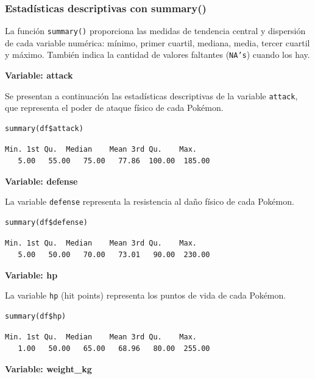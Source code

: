 \documentclass[11pt,a4paper]{article}
\begin{document}
\subsubsection{Estadísticas descriptivas con summary()}

La función \texttt{summary()} proporciona las medidas de tendencia central y dispersión de cada variable
numérica: mínimo, primer cuartil, mediana, media, tercer cuartil y máximo. También indica la cantidad
de valores faltantes (\texttt{NA's}) cuando los hay.

\textbf{Variable: attack}

Se presentan a continuación las estadísticas descriptivas de la variable \texttt{attack}, que representa
el poder de ataque físico de cada Pokémon.

\begin{lstlisting}[style=Rstyle]
summary(df$attack)
\end{lstlisting}

\begin{lstlisting}[style=Routput]
   Min. 1st Qu.  Median    Mean 3rd Qu.    Max.
   5.00   55.00   75.00   77.86  100.00  185.00
\end{lstlisting}

\textbf{Variable: defense}

La variable \texttt{defense} representa la resistencia al daño físico de cada Pokémon.

\begin{lstlisting}[style=Rstyle]
summary(df$defense)
\end{lstlisting}

\begin{lstlisting}[style=Routput]
   Min. 1st Qu.  Median    Mean 3rd Qu.    Max.
   5.00   50.00   70.00   73.01   90.00  230.00
\end{lstlisting}

\textbf{Variable: hp}

La variable \texttt{hp} (hit points) representa los puntos de vida de cada Pokémon.

\begin{lstlisting}[style=Rstyle]
summary(df$hp)
\end{lstlisting}

\begin{lstlisting}[style=Routput]
   Min. 1st Qu.  Median    Mean 3rd Qu.    Max.
   1.00   50.00   65.00   68.96   80.00  255.00
\end{lstlisting}

\textbf{Variable: weight\_kg}
\end{document}
